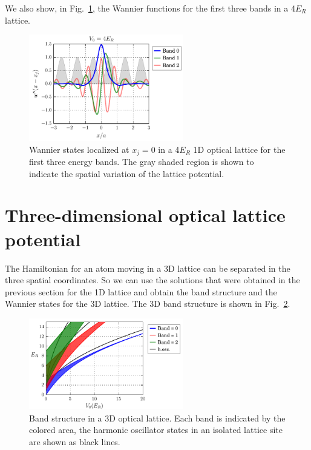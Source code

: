 We also show, in Fig.~\ref{fig:wannier1d_bands}, the Wannier functions for the
first three bands in a 4$E_{R}$ lattice.  
\begin{figure}
\centering
\includegraphics[width=0.6\textwidth]{../figures/BandStructure_figures/wannier1d_bands.pdf}
\caption[Wannier states in 1D lattice for the first three energy bands.]{\small
Wannier states localized at $x_{j}=0$  in a 4$E_{R}$ 1D optical lattice for the
first three energy bands.  The gray shaded region is shown to  indicate the
spatial variation of the lattice potential.  } \label{fig:wannier1d_bands}
\end{figure}

\section{Three-dimensional optical lattice potential}

The Hamiltonian for an atom moving in a  3D lattice can be separated in the
three spatial coordinates.  So we can use the solutions that were obtained in
the previous section for the 1D lattice and obtain the band structure and the
Wannier states for the 3D lattice.   The 3D band structure is shown in
Fig.~\ref{fig:bands3d_V0}. 
\begin{figure}
\centering \includegraphics[width=0.6\textwidth]{../figures/BandStructure_figures/bands3d_V0.pdf}
\caption[Band structure in 3D lattice.]{\small Band structure in a 3D optical
lattice.  Each band is indicated by the colored area,  the harmonic oscillator
states in an isolated lattice site are shown as black lines. }
\label{fig:bands3d_V0}
\end{figure}

